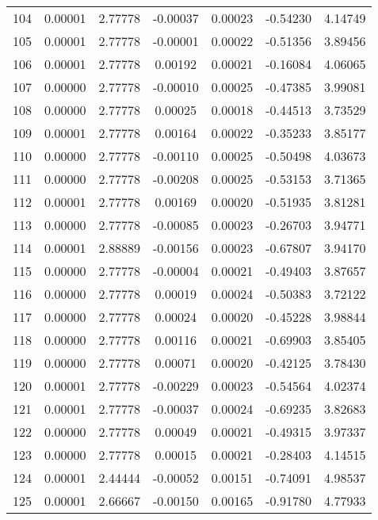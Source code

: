 \begin{longtable}{c c c c c c c}
104 &  0.00001 &      2.77778 & -0.00037 &   0.00023 &  -0.54230 &   4.14749 \\
105 &  0.00001 &      2.77778 & -0.00001 &   0.00022 &  -0.51356 &   3.89456 \\
106 &  0.00001 &      2.77778 &  0.00192 &   0.00021 &  -0.16084 &   4.06065 \\
107 &  0.00000 &      2.77778 & -0.00010 &   0.00025 &  -0.47385 &   3.99081 \\
108 &  0.00000 &      2.77778 &  0.00025 &   0.00018 &  -0.44513 &   3.73529 \\
109 &  0.00001 &      2.77778 &  0.00164 &   0.00022 &  -0.35233 &   3.85177 \\
110 &  0.00000 &      2.77778 & -0.00110 &   0.00025 &  -0.50498 &   4.03673 \\
111 &  0.00000 &      2.77778 & -0.00208 &   0.00025 &  -0.53153 &   3.71365 \\
112 &  0.00001 &      2.77778 &  0.00169 &   0.00020 &  -0.51935 &   3.81281 \\
113 &  0.00000 &      2.77778 & -0.00085 &   0.00023 &  -0.26703 &   3.94771 \\
114 &  0.00001 &      2.88889 & -0.00156 &   0.00023 &  -0.67807 &   3.94170 \\
115 &  0.00000 &      2.77778 & -0.00004 &   0.00021 &  -0.49403 &   3.87657 \\
116 &  0.00000 &      2.77778 &  0.00019 &   0.00024 &  -0.50383 &   3.72122 \\
117 &  0.00000 &      2.77778 &  0.00024 &   0.00020 &  -0.45228 &   3.98844 \\
118 &  0.00000 &      2.77778 &  0.00116 &   0.00021 &  -0.69903 &   3.85405 \\
119 &  0.00000 &      2.77778 &  0.00071 &   0.00020 &  -0.42125 &   3.78430 \\
120 &  0.00001 &      2.77778 & -0.00229 &   0.00023 &  -0.54564 &   4.02374 \\
121 &  0.00001 &      2.77778 & -0.00037 &   0.00024 &  -0.69235 &   3.82683 \\
122 &  0.00000 &      2.77778 &  0.00049 &   0.00021 &  -0.49315 &   3.97337 \\
123 &  0.00000 &      2.77778 &  0.00015 &   0.00021 &  -0.28403 &   4.14515 \\
124 &  0.00001 &      2.44444 & -0.00052 &   0.00151 &  -0.74091 &   4.98537 \\
125 &  0.00001 &      2.66667 & -0.00150 &   0.00165 &  -0.91780 &   4.77933 \\

\end{longtable}

